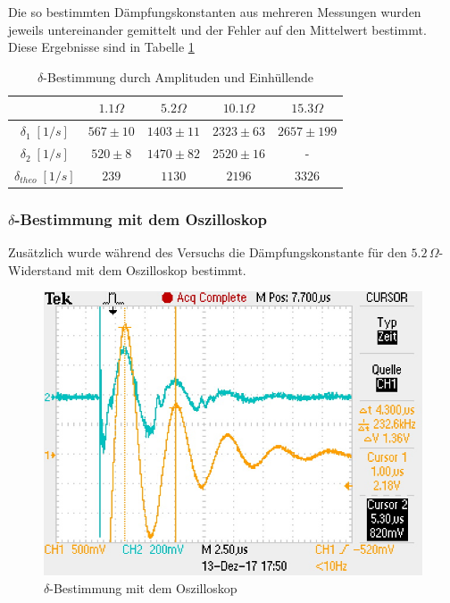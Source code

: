 \documentclass[a4paper, 11pt]{article}
\begin{document}
Die so bestimmten Dämpfungskonstanten aus mehreren Messungen wurden jeweils untereinander gemittelt und der Fehler auf den Mittelwert bestimmt.
Diese Ergebnisse sind in Tabelle \ref{table:deltas}

\begin{table}[H]
	\centering
	\renewcommand{\arraystretch}{1.2}
	\begin{tabular}{|c|c|c|c|c|}
		\hline 
		& $1.1 \Omega$ & $5.2 \Omega$ & $10.1 \Omega$ & $15.3 \Omega$ \\
		\hline 
		$\delta_{1} \;[1/s]$ & $567 \pm 10$ & $1403 \pm 11$ & $2323 \pm 63$ & $2657 \pm 199$ \\
		\hline
		$\delta_{2} \;[1/s]$ & $520 \pm 8$ & $ 1470 \pm 82$ & $ 2520 \pm 16$ & - \\
		\hline
		$\delta_{theo} \;[1/s]$ & $239$ & $1130$ & $ 2196$ & $3326$ \\
		\hline
	\end{tabular}
	\label{table:deltas}
	\caption{$\delta$-Bestimmung durch Amplituden und Einhüllende}
\end{table}

\subsubsection{$\delta$-Bestimmung mit dem Oszilloskop}
Zusätzlich wurde während des Versuchs die Dämpfungskonstante für den $5.2\,\Omega$-Widerstand mit dem Oszilloskop bestimmt.
\begin{figure}[H]
	\centering
	\includegraphics[scale=1]{../Oszi/F0008TEK.JPG}
	\caption{$\delta$-Bestimmung mit dem Oszilloskop}
	\label{fig:Oszi}
\end{figure}
\end{document}

